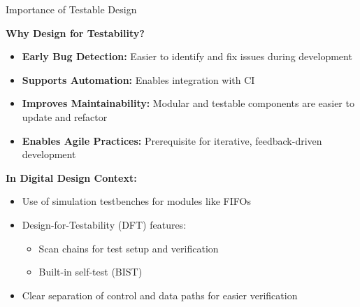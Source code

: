 \begin{frame}{Importance of Testable Design}
	
	\textbf{Why Design for Testability?}
	\begin{itemize}
		\item \textbf{Early Bug Detection:} Easier to identify and fix issues during development
		\item \textbf{Supports Automation:} Enables integration with CI
		\item \textbf{Improves Maintainability:} Modular and testable components are easier to update and refactor
		\item \textbf{Enables Agile Practices:} Prerequisite for iterative, feedback-driven development
	\end{itemize}
	\pause
	
	\textbf{In Digital Design Context:}
	\begin{itemize}
		\item Use of simulation testbenches for modules like FIFOs
		\item Design-for-Testability (DFT) features:
		\begin{itemize}
			\item Scan chains for test setup and verification
			\item Built-in self-test (BIST)
		\end{itemize}
		\item Clear separation of control and data paths for easier verification
	\end{itemize}
	
\end{frame}

